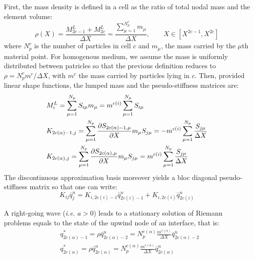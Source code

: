 First, the mass density is defined in a cell as the ratio of total nodal mass and the element volume:
\begin{equation}
  \label{eq:grid_density}
  \rho(X) = \frac{M^L_{2c-1}+M^L_{2c}}{\Delta X} = \frac{\sum_{\mu=1}^{N_p^c} m_\mu}{\Delta X}, \qquad X \in [X^{2c-1},X^{2c}]
\end{equation}
where $N_p^{c}$ is the number of particles in cell $c$ and $m_\mu$, the mass carried by the $\mu$th material point. For homogenous medium, we assume the mass is uniformly distributed between patricles so that the previous definition reduces to $\rho = N_p^{c} m^c/\Delta X$, with $m^c$ the mass carried by particles lying in $c$. Then, provided linear shape functions, the lumped mass and the pseudo-stiffness matrices are:
\begin{align}
  & M^L_i = \sum_{\mu=1}^{N_p} S_{i\mu} m_\mu = m^{c(i)} \sum_{\mu=1}^{N_p} S_{i\mu}\\
  & K_{2c(\alpha)-1,j} = \sum_{\mu=1}^{N_p} \frac{\partial S_{2c(\alpha)-1,\mu}}{\partial X} m_\mu S_{j\mu} = -m^{c(i)} \sum_{\mu=1}^{N_p} \frac{ S_{j\mu}}{\Delta X} \\
  & K_{2c(\alpha),j} = \sum_{\mu=1}^{N_p} \frac{\partial S_{2c(\alpha),\mu}}{\partial X} m_\mu S_{j\mu} = m^{c(i)}\sum_{\mu=1}^{N_p} \frac{ S_{j\mu}}{\Delta X} 
\end{align}
The discontinuous approximation basis moreover yields a bloc diagonal pseudo-stiffness matrix so that one can write:
\begin{equation}
  \label{eq:block_diag_K}
  K_{ij} \bar{q}_{j}^{n}= K_{i,2c(i)-1} \bar{q}_{2c(i)-1}^{n}+K_{i,2c(i)} \bar{q}_{2c(i)}^{n}
\end{equation}

A right-going wave (\textit{i.e. $a>0$}) leads to a stationary solution of Riemann problems equals to the state of the upwind node of an interface, that is:
\begin{align}
  & q_{2c(\alpha)-1}^* = \rho \bar{q}^n_{2c(\alpha)-2}=  N_p^{c(\alpha)}\frac{ m^{c(\alpha)}}{\Delta X}\bar{q}^n_{2c(\alpha)-2} \\
  & q_{2c(\alpha)}^* = \rho \bar{q}^n_{2c(\alpha)} =  N_p^{c(\alpha)}\frac{ m^{c(\alpha)}}{\Delta X} \bar{q}^n_{2c(\alpha)} 
\end{align}

